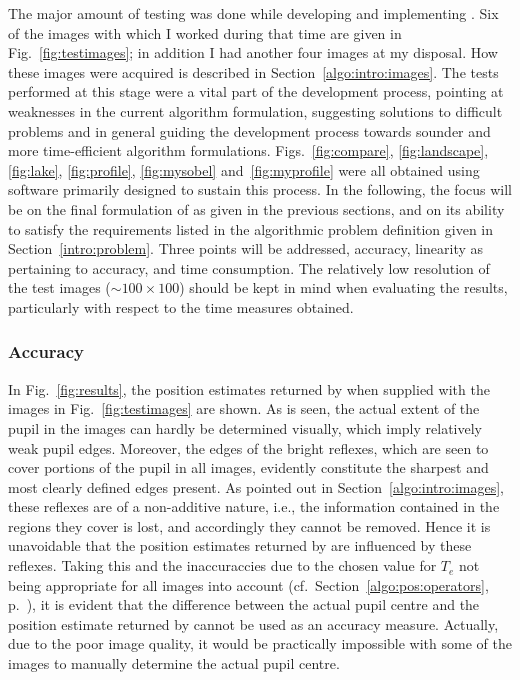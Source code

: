 The major amount of testing was done while developing and implementing
{\octopus}.  Six of the images with which I worked during that time
are given in Fig.~\ref{fig:testimages}; in addition I had another four
images at my disposal.  How these images were acquired is described in
Section~\ref{algo:intro:images}.  The tests performed at this stage
were a vital part of the development process, pointing at weaknesses
in the current algorithm formulation, suggesting solutions to
difficult problems and in general guiding the development process
towards sounder and more time-efficient algorithm formulations.
Figs.~\ref{fig:compare}, \ref{fig:landscape}, \ref{fig:lake},
\ref{fig:profile}, \ref{fig:mysobel} and~\ref{fig:myprofile} were all
obtained using software primarily designed to sustain this process.
In the following, the focus will be on the final formulation of
{\octopus} as given in the previous sections, and on its ability to
satisfy the requirements listed in the algorithmic problem definition
given in Section~\ref{intro:problem}.  Three points will be addressed,
accuracy, linearity as pertaining to accuracy, and time consumption.
The relatively low resolution of the test images ($\sim 100\times
100$) should be kept in mind when evaluating the results, particularly
with respect to the time measures obtained.

\subsubsection{Accuracy}

In Fig.~\ref{fig:results}, the position estimates returned by
{\octopus} when supplied with the images in Fig.~\ref{fig:testimages}
are shown.  As is seen, the actual extent of the pupil in the images
can hardly be determined visually, which imply relatively weak pupil
edges.  Moreover, the edges of the bright reflexes, which are seen to
cover portions of the pupil in all images, evidently constitute the
sharpest and most clearly defined edges present.  As pointed out in
Section~\ref{algo:intro:images}, these reflexes are of a non-additive
nature, i.e., the information contained in the regions they cover is
lost, and accordingly they cannot be removed.  Hence it is unavoidable
that the position estimates returned by {\octopus} are influenced by
these reflexes.  Taking this and the inaccuraccies due to the chosen
value for $T_{e}$ not being appropriate for all images into account
(cf.\ Section~\ref{algo:pos:operators}, p.~\pageref{pg:TEproblems}),
it is evident that the difference between the actual pupil centre and
the position estimate returned by {\octopus} cannot be used as an
accuracy measure.  Actually, due to the poor image quality, it would
be practically impossible with some of the images to manually
determine the actual pupil centre.

